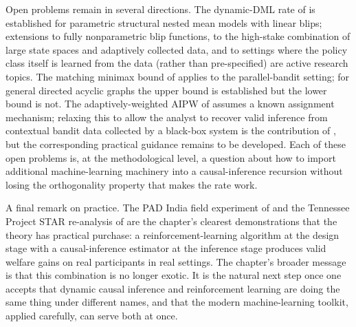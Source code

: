 Open problems remain in several directions. The dynamic-DML rate of \citet{lewisSyrgkanis2021dynamicDML} is established for parametric structural nested mean models with linear blips; extensions to fully nonparametric blip functions, to the high-stake combination of large state spaces and adaptively collected data, and to settings where the policy class itself is learned from the data (rather than pre-specified) are active research topics. The matching minimax bound of \citet{lattimore2016causal} applies to the parallel-bandit setting; for general directed acyclic graphs the upper bound is established but the lower bound is not. The adaptively-weighted AIPW of \citet{hadad2021adaptive} assumes a known assignment mechanism; relaxing this to allow the analyst to recover valid inference from contextual bandit data collected by a black-box system is the contribution of \citet{bibaut2021post}, but the corresponding practical guidance remains to be developed. Each of these open problems is, at the methodological level, a question about how to import additional machine-learning machinery into a causal-inference recursion without losing the orthogonality property that makes the rate work.

A final remark on practice. The PAD India field experiment of \citet{kasy2021adaptive} and the Tennessee Project STAR re-analysis of \citet{sakaguchi2024dynamicpolicy} are the chapter's clearest demonstrations that the theory has practical purchase: a reinforcement-learning algorithm at the design stage with a causal-inference estimator at the inference stage produces valid welfare gains on real participants in real settings. The chapter's broader message is that this combination is no longer exotic. It is the natural next step once one accepts that dynamic causal inference and reinforcement learning are doing the same thing under different names, and that the modern machine-learning toolkit, applied carefully, can serve both at once.
